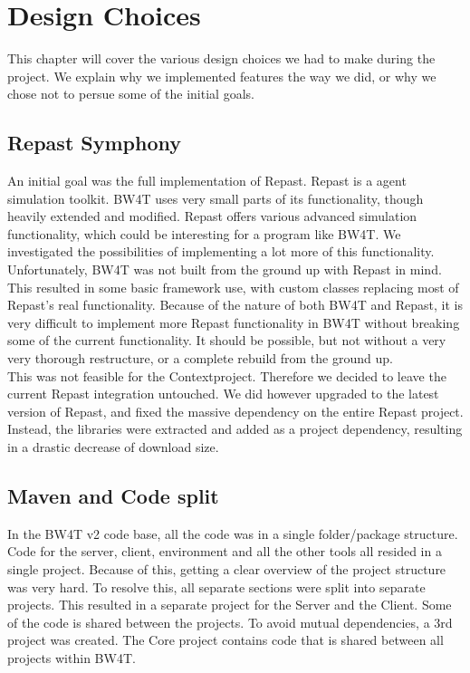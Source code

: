 \chapter{Design Choices}
This chapter will cover the various design choices we had to make during the project. We explain why we implemented features the way we did, or why we chose not to persue some of the initial goals. 

\section{Repast Symphony}
An initial goal was the full implementation of Repast. Repast is a agent simulation toolkit. BW4T uses very small parts of its functionality, though heavily extended and modified. Repast offers various advanced simulation functionality, which could be interesting for a program like BW4T. We investigated the possibilities of implementing a lot more of this functionality. Unfortunately, BW4T was not built from the ground up with Repast in mind. This resulted in some basic framework use, with custom classes replacing most of Repast's real functionality. Because of the nature of both BW4T and Repast, it is very difficult to implement more Repast functionality in BW4T without breaking some of the current functionality. It should be possible, but not without a very very thorough restructure, or a complete rebuild from the ground up. \\

This was not feasible for the Contextproject. Therefore we decided to leave the current Repast integration untouched. We did however upgraded to the latest version of Repast, and fixed the massive dependency on the entire Repast project. Instead, the libraries were extracted and added as a project dependency, resulting in a drastic decrease of download size. 

\section{Maven and Code split} %
In the BW4T v2 code base, all the code was in a single folder/package structure. Code for the server, client, environment and all the other tools all resided in a single project. Because of this, getting a clear overview of the project structure was very hard. To resolve this, all separate sections were split into separate projects. This resulted in a separate project for the Server and the Client. Some of the code is shared between the projects. To avoid mutual dependencies, a 3rd project was created. The Core project contains code that is shared between all projects within BW4T. 

